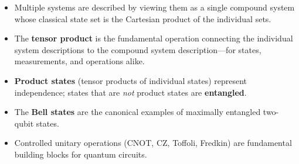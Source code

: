 \documentclass[11pt]{article}
\theoremstyle{definition}
\begin{document}
\begin{itemize}
    \item Multiple systems are described by viewing them as a single compound system whose classical state set is the Cartesian product of the individual sets.
    \item The \textbf{tensor product} is the fundamental operation connecting the individual system descriptions to the compound system description---for states, measurements, and operations alike.
    \item \textbf{Product states} (tensor products of individual states) represent independence; states that are \emph{not} product states are \textbf{entangled}.
    \item The \textbf{Bell states} are the canonical examples of maximally entangled two-qubit states.
    \item Controlled unitary operations (CNOT, CZ, Toffoli, Fredkin) are fundamental building blocks for quantum circuits.
\end{itemize}
\end{document}

